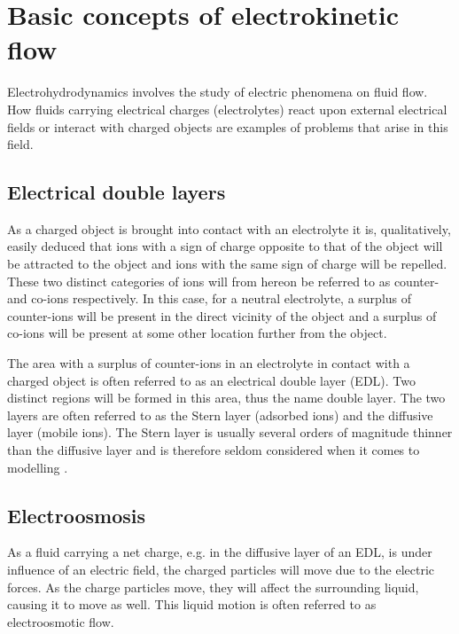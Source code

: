 \section{Basic concepts of electrokinetic flow}
Electrohydrodynamics involves the study of electric phenomena on fluid
flow. How fluids carrying electrical charges (electrolytes) react upon
external electrical fields or interact with charged objects are
examples of problems that arise in this field. 

\subsection{Electrical double layers}
As a charged object is brought into contact with an electrolyte it is,
qualitatively, easily deduced that ions with a sign of charge opposite
to that of the object will be attracted to the object and ions with
the same sign of charge will be repelled. These two distinct
categories of ions will from hereon be referred to as counter- and
co-ions respectively. In this case, for a neutral electrolyte, a
surplus of counter-ions will be present in the direct vicinity of the
object and a surplus of co-ions will be present at some other location
further from the object.
 
The area with a surplus of counter-ions in an electrolyte in contact
with a charged object is often referred to as an electrical double
layer (EDL). Two distinct regions will be formed in this area, thus
the name double layer. The two layers are often referred to as the
Stern layer (adsorbed ions) and the diffusive layer (mobile ions). The
Stern layer is usually several orders of magnitude thinner than the
diffusive layer and is therefore seldom considered when it comes to
modelling \cite{dongquing-ren-book}.  

\subsection{Electroosmosis}
As a fluid carrying a net charge, e.g. in the diffusive layer of an
EDL, is under influence of an electric field, the charged particles
will move due to the electric forces. As the charge particles move,
they will affect the surrounding liquid, causing it to move as
well. This liquid motion is often referred to as electroosmotic
flow. \cite{dongquing-ren-book}


